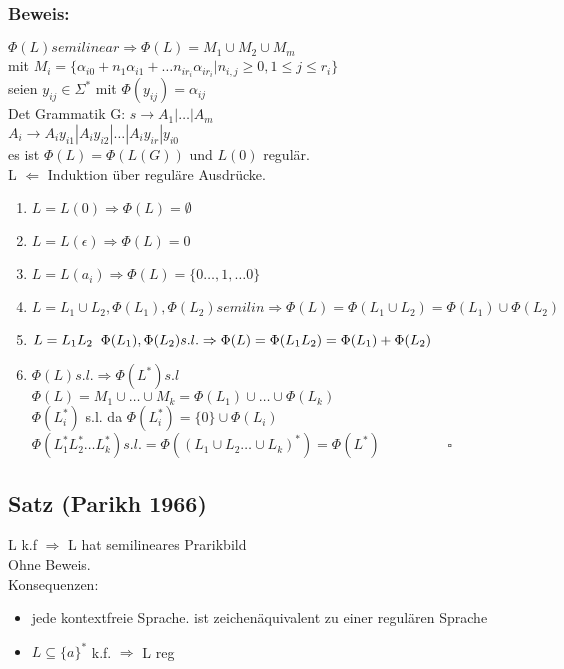 	\subsubsection{Beweis:}
	$\Phi(L) semilinear \Rightarrow \Phi(L)= M_1\cup M_2\cup M_m$ \\mit $M_i =\{\alpha_{i0}+n_1\alpha_{i1}+\dots n_{ir_{i}}\alpha_{ir_{i}}|n_{i,j}\geq0, 1\leq j \leq r_i\}$\\
	seien $y_{ij} \in \Sigma^*$ mit $\Phi(y_{ij})=\alpha_{ij}$\\
	Det Grammatik G: $s\rightarrow A_1|\dots|A_m$\\
	$A_i\rightarrow A_iy_{i1}| A_iy_{i2}|\dots| A_iy_{ir}|y_{i0}$\\
	es ist $\Phi(L)=\Phi(L(G))$ und $L(0)$ regulär.\\
	L $\Leftarrow$ Induktion über reguläre Ausdrücke.
	\begin{enumerate}
		\item $L=L(0) \Rightarrow \Phi(L)=\emptyset$
		\item $L=L(\epsilon) \Rightarrow \Phi(L)=0$
		\item $L=L(a_i) \Rightarrow \Phi(L)= \{0\dots,1,\dots 0\}$
		\item $L=L_1 \cup L_2, \Phi(L_1),\Phi(L_2) semilin \Rightarrow \Phi(L)= \Phi(L_1\cup L_2)=\Phi(L_1)\cup \Phi(L_2)$
		\item $L=L_1L_2 \hspace{0.2cm}\Phi(L_1),\Phi(L_2) s.l. \Rightarrow \Phi(L)= \Phi(L_1L_2)=\Phi(L_1)+ \Phi(L_2)$
		\item $\Phi(L) s.l. \Rightarrow \Phi(L^*) s.l$\\
		$\Phi(L)=M_1\cup\dots\cup M_k =\Phi(L_1)\cup\dots\cup\Phi(L_k)$\\
		$\Phi(L_i^*)$ s.l. da $\Phi(L_i^*)=\{0\}\cup\Phi(L_i)$\\ %
		$\Phi(L_1^*L_2^*\dots L_k^*) s.l. = \Phi((L_1\cup L_2\dots \cup L_k)^*)=\Phi(L^*) \hspace{2cm} \square$
	\end{enumerate}

	\subsection{Satz (Parikh 1966)}
	L k.f $\Rightarrow$ L hat semilineares Prarikbild\\
	Ohne Beweis.\\


	Konsequenzen:\\
	\begin{itemize}
		\item jede kontextfreie Sprache. ist zeichenäquivalent zu einer regulären Sprache
		\item $L\subseteq\{a\}^*$ k.f. $\Rightarrow$ L reg
	\end{itemize}

